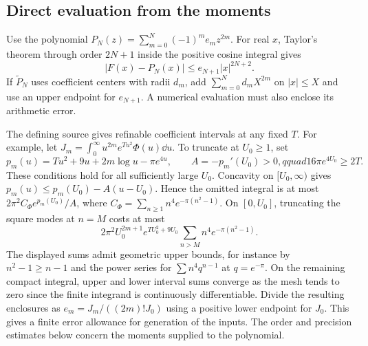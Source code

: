 

\subsection{Direct evaluation from the moments}

Use the polynomial \(P_N(z)=\sum_{m=0}^N(-1)^m e_m z^{2m}\).
For real \(x\), Taylor's theorem through order \(2N+1\) inside the
positive cosine integral gives
\begin{equation}\label{eq:moment-real-error}
 |F(x)-P_N(x)|\le e_{N+1}|x|^{2N+2}.
\end{equation}
If \(\widetilde P_N\) uses coefficient centers with radii \(d_m\), add
\(\sum_{m=0}^N d_m X^{2m}\) on \(|x|\le X\) and use an upper
endpoint for \(e_{N+1}\). A numerical evaluation must also enclose its
arithmetic error.

The defining source gives refinable coefficient intervals at any fixed
\(T\). For example, let \(J_m=\int_0^\infty u^{2m}e^{Tu^2}\Phi(u)\dd u\).
To truncate at \(U_0\ge1\), set
\[
 p_m(u)=Tu^2+9u+2m\log u-\pi e^{4u},\qquad
 A=-p_m'(U_0)>0,qquad 16\pi e^{4U_0}\ge2T .
\]
These conditions hold for all sufficiently large \(U_0\).
Concavity on \([U_0,\infty)\) gives
\(p_m(u)\le p_m(U_0)-A(u-U_0)\). Hence the omitted integral is
at most \(2\pi^2 C_\Phi e^{p_m(U_0)}/A\), where
\(C_\Phi=\sum_{n\ge1}n^4 e^{-\pi(n^2-1)}\).
On \([0,U_0]\), truncating the square modes at \(n=M\) costs at most
\[
 2\pi^2 U_0^{2m+1} e^{TU_0^2+9U_0}
       \sum_{n>M}n^4 e^{-\pi(n^2-1)} .
\]
The displayed sums admit geometric upper bounds, for instance by
\(n^2-1\ge n-1\) and the power series for \(\sum n^4 q^{n-1}\) at
\(q=e^{-\pi}\). On the remaining compact integral, upper and lower
interval sums converge as the mesh tends to zero since the finite
integrand is continuously differentiable. Divide the resulting
enclosures as \(e_m=J_m/((2m)!J_0)\) using a positive lower endpoint
for \(J_0\). This gives a finite error allowance for generation of the
inputs. The order and precision estimates below concern the moments
supplied to the polynomial.

